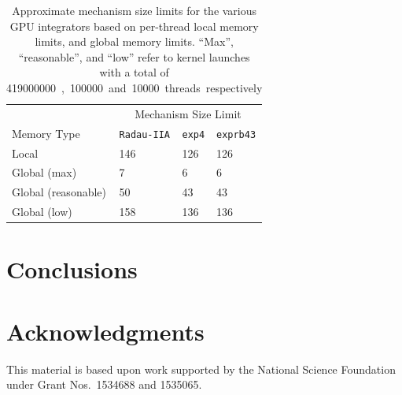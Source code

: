 \documentclass[preprint]{elsarticle}
\begin{document}
\begin{table}[tbp]
\centering
\begin{tabular}{@{}l l l l@{}}
 \toprule
& \multicolumn{3}{c}{Mechanism Size Limit} \\
Memory Type & \texttt{Radau-IIA} & \texttt{exp4} & \texttt{exprb43} \\
\midrule
Local	    & 146 & 126 & 126 \\

Global (max)	    & 7 & 6 & 6 \\
Global (reasonable) & 50 & 43 & 43 \\
Global (low) & 158 & 136 & 136 \\
\bottomrule
\end{tabular}
\caption{
Approximate mechanism size limits for the various GPU integrators based on per-thread local memory limits, and global memory limits.
``Max'', ``reasonable'', and ``low'' refer to kernel launches with a total of \SI{419000000}, \SI{100000} and \SI{10000} threads respectively
}
\label{T:size_limits}
\end{table}

\section{Conclusions}


\section*{Acknowledgments}

This material is based upon work supported by the National Science Foundation under Grant Nos.~1534688 and 1535065.


\pagebreak



\end{document}
